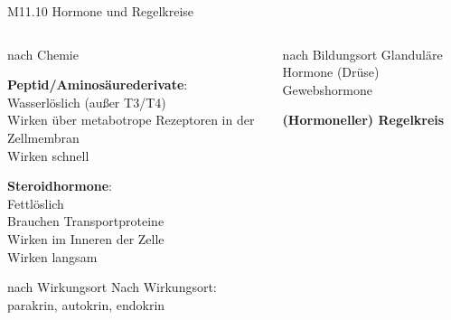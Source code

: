 \documentclass{beamer}
\date{WiSe 2022/23}
\begin{document}



\begin{frame}{M11.10 Hormone und Regelkreise}


\begin{columns}[c]

\begin{column}{5cm}

\begin{block}{nach Chemie}

 \textbf{Peptid/Aminosäurederivate}: \\
 Wasserlöslich (außer T3/T4) \\
 Wirken über metabotrope Rezeptoren in der Zellmembran  \\
 Wirken schnell
 
\textbf{Steroidhormone}: \\
Fettlöslich \\
Brauchen Transportproteine \\
Wirken im Inneren der Zelle \\
Wirken langsam \\


\end{block}

\begin{block}{nach Wirkungsort}
Nach Wirkungsort: parakrin, autokrin, endokrin
\end{block}



\end{column}


\begin{column}{6cm}

\begin{block}{nach Bildungsort}
Glanduläre Hormone (Drüse) \\
Gewebshormone
\end{block}

\pause

\textbf{(Hormoneller) Regelkreis}


\end{column}
\end{columns}
\end{frame}
\end{document}
